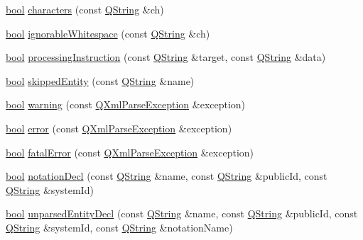 \begin{DoxyCompactItemize}
\item 
\hyperlink{qglobal_8h_a1062901a7428fdd9c7f180f5e01ea056}{bool} \hyperlink{class_q_xml_default_handler_a40c64e4f7fc445abeb753ef11c75f84a}{characters} (const \hyperlink{class_q_string}{Q\+String} \&ch)
\item 
\hyperlink{qglobal_8h_a1062901a7428fdd9c7f180f5e01ea056}{bool} \hyperlink{class_q_xml_default_handler_aaba270fb05abfab3f80c31312f6537af}{ignorable\+Whitespace} (const \hyperlink{class_q_string}{Q\+String} \&ch)
\item 
\hyperlink{qglobal_8h_a1062901a7428fdd9c7f180f5e01ea056}{bool} \hyperlink{class_q_xml_default_handler_afd9bbe78b71f7787e22a3a7555ddba59}{processing\+Instruction} (const \hyperlink{class_q_string}{Q\+String} \&target, const \hyperlink{class_q_string}{Q\+String} \&data)
\item 
\hyperlink{qglobal_8h_a1062901a7428fdd9c7f180f5e01ea056}{bool} \hyperlink{class_q_xml_default_handler_a8c02fbe04d75e0ac50202f21e101e5c9}{skipped\+Entity} (const \hyperlink{class_q_string}{Q\+String} \&name)
\item 
\hyperlink{qglobal_8h_a1062901a7428fdd9c7f180f5e01ea056}{bool} \hyperlink{class_q_xml_default_handler_acaabb9885b0d301b151112ea3e05f361}{warning} (const \hyperlink{class_q_xml_parse_exception}{Q\+Xml\+Parse\+Exception} \&exception)
\item 
\hyperlink{qglobal_8h_a1062901a7428fdd9c7f180f5e01ea056}{bool} \hyperlink{class_q_xml_default_handler_a2511bdad8a588353b28292266cf6bdd4}{error} (const \hyperlink{class_q_xml_parse_exception}{Q\+Xml\+Parse\+Exception} \&exception)
\item 
\hyperlink{qglobal_8h_a1062901a7428fdd9c7f180f5e01ea056}{bool} \hyperlink{class_q_xml_default_handler_a365448a99398f6939706d6e63e6b215d}{fatal\+Error} (const \hyperlink{class_q_xml_parse_exception}{Q\+Xml\+Parse\+Exception} \&exception)
\item 
\hyperlink{qglobal_8h_a1062901a7428fdd9c7f180f5e01ea056}{bool} \hyperlink{class_q_xml_default_handler_aaa24e258c75cd45e2bd560864b418958}{notation\+Decl} (const \hyperlink{class_q_string}{Q\+String} \&name, const \hyperlink{class_q_string}{Q\+String} \&public\+Id, const \hyperlink{class_q_string}{Q\+String} \&system\+Id)
\item 
\hyperlink{qglobal_8h_a1062901a7428fdd9c7f180f5e01ea056}{bool} \hyperlink{class_q_xml_default_handler_ae4fe530e822e9d5d92a1c849c3f96488}{unparsed\+Entity\+Decl} (const \hyperlink{class_q_string}{Q\+String} \&name, const \hyperlink{class_q_string}{Q\+String} \&public\+Id, const \hyperlink{class_q_string}{Q\+String} \&system\+Id, const \hyperlink{class_q_string}{Q\+String} \&notation\+Name)

\end{DoxyCompactItemize}
